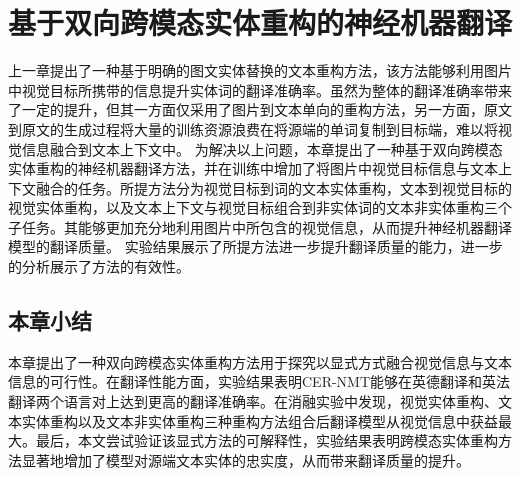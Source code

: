 \chapter{基于双向跨模态实体重构的神经机器翻译}

上一章提出了一种基于明确的图文实体替换的文本重构方法，该方法能够利用图片中视觉目标所携带的信息提升实体词的翻译准确率。虽然为整体的翻译准确率带来了一定的提升，但其一方面仅采用了图片到文本单向的重构方法，另一方面，原文到原文的生成过程将大量的训练资源浪费在将源端的单词复制到目标端，难以将视觉信息融合到文本上下文中。
为解决以上问题，本章提出了一种基于双向跨模态实体重构的神经机器翻译方法，并在训练中增加了将图片中视觉目标信息与文本上下文融合的任务。所提方法分为视觉目标到词的文本实体重构，文本到视觉目标的视觉实体重构，以及文本上下文与视觉目标组合到非实体词的文本非实体重构三个子任务。其能够更加充分地利用图片中所包含的视觉信息，从而提升神经机器翻译模型的翻译质量。
实验结果展示了所提方法进一步提升翻译质量的能力，进一步的分析展示了方法的有效性。








\section{本章小结}
本章提出了一种双向跨模态实体重构方法用于探究以显式方式融合视觉信息与文本信息的可行性。在翻译性能方面，实验结果表明CER-NMT能够在英德翻译和英法翻译两个语言对上达到更高的翻译准确率。在消融实验中发现，视觉实体重构、文本实体重构以及文本非实体重构三种重构方法组合后翻译模型从视觉信息中获益最大。最后，本文尝试验证该显式方法的可解释性，实验结果表明跨模态实体重构方法显著地增加了模型对源端文本实体的忠实度，从而带来翻译质量的提升。
